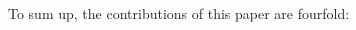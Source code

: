 \documentclass[journal,twocolumn]{IEEEtran}
\begin{document}
\begin{CJK*}{UTF8}{gkai}

To sum up, the contributions of this paper are fourfold: 


\end{CJK*}
\end{document}
